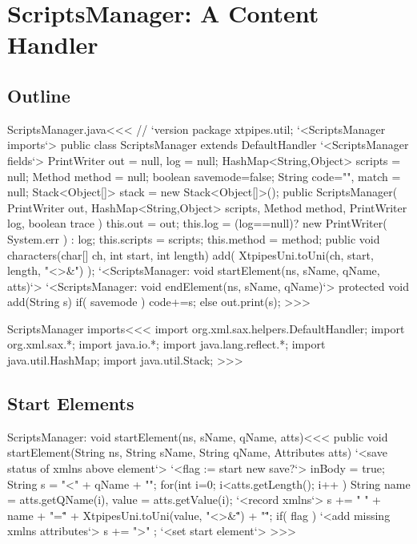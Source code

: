 \documentclass{article}
\begin{document}
\section{ScriptsManager: A Content Handler}

\label{ScriptsManager}


\subsection{Outline}




\<ScriptsManager.java\><<<
// `version
package xtpipes.util;
`<ScriptsManager imports`>
public class ScriptsManager extends DefaultHandler {
     `<ScriptsManager fields`>
     PrintWriter out = null, log = null;
     HashMap<String,Object> scripts = null;
     Method method = null;
     boolean savemode=false;
     String code="", match = null;
     Stack<Object[]> stack = new Stack<Object[]>();
   public ScriptsManager( PrintWriter out, 
                          HashMap<String,Object> scripts,
                          Method method,
                          PrintWriter log, boolean trace ){
     this.out = out;
     this.log = (log==null)? new PrintWriter( System.err ) : log;
     this.scripts = scripts;
     this.method = method;
   }
   public void characters(char[] ch, int start, int length){
     add( XtpipesUni.toUni(ch, start, length, "<>&") );
   }
   `<ScriptsManager: void startElement(ns, sName, qName, atts)`>
   `<ScriptsManager: void endElement(ns, sName, qName)`>
   protected void add(String s){
      if( savemode ){ code+=s; }
      else { out.print(s); }
}  }
>>>


\<ScriptsManager imports\><<<
import org.xml.sax.helpers.DefaultHandler;
import org.xml.sax.*;     
import java.io.*;     
import java.lang.reflect.*;
import java.util.HashMap;
import java.util.Stack; 
>>>

\subsection{Start Elements}




\<ScriptsManager: void startElement(ns, sName, qName, atts)\><<<
public void startElement(String ns, String sName,
                        String qName, Attributes atts) {
   `<save status of xmlns above element`>
   `<flag := start new save?`>
   inBody = true;
   String s =  "<" + qName + "\n";
   for(int i=0; i<atts.getLength(); i++ ){
      String name = atts.getQName(i),
             value = atts.getValue(i);
      `<record xmlns`>
      s += " " + name + "=\"" + 
         XtpipesUni.toUni(value, "<>&\"") + "\"";
   } 
   if( flag ){ `<add missing xmlns attributes`> }
   s += ">" ;
   `<set start element`>
}
>>>
\end{document}
